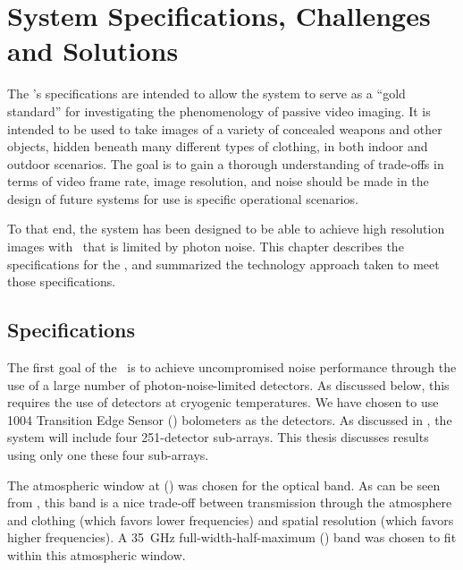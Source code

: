 \chapter{System Specifications, Challenges and Solutions}\label{c:specs}

The \Imager's specifications are intended to allow the system to serve as a ``gold standard'' for investigating the phenomenology of passive video imaging.
It is intended to be used to take images of a variety of concealed weapons and other objects, hidden beneath many different types of clothing, in both indoor and outdoor scenarios.
The goal is to gain a thorough understanding of trade-offs in terms of video frame rate, image resolution, and noise should be made in the design of future systems for use is specific operational scenarios.

To that end, the system has been designed to be able to achieve high resolution images with \NETD\ that is limited by photon noise.
This chapter describes the specifications for the \Imager, and summarized the technology approach taken to meet those specifications.

\section{Specifications} \label{sec:ch2-specifications}

The first goal of the \Imager\ is to achieve uncompromised noise performance through the use of a large number of photon-noise-limited detectors.
As discussed below, this requires the use of detectors at cryogenic temperatures.
We have chosen to use 1004 Transition Edge Sensor (\TES) bolometers as the detectors.
As discussed in , the system will include four 251-detector sub-arrays.
This thesis discusses results using only one these four sub-arrays.

The atmospheric window at  () was chosen for the optical band.
As can be seen from , this band is a nice trade-off between transmission through the atmosphere and clothing (which favors lower frequencies) and spatial resolution (which favors higher frequencies).
A \SI{35}{\GHz} full-width-half-maximum (\FWHM) band was chosen to fit within this atmospheric window.

